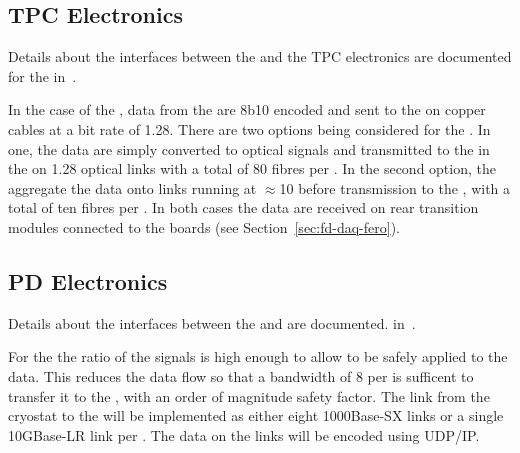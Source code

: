
\subsection{TPC Electronics}
\label{sec:fd-daq-intfc-elec}

Details about the interfaces between the  and the TPC electronics
are documented for the  
in~\cite{docdb-6742}.

In the case of the , data from the  
 are 8b10 encoded and sent to the
 on copper cables at a bit rate of \SI{1.28}{\Gbps}. There
are two options being considered for the . In one, the
data are simply converted to optical signals and transmitted to the
 in the  on \SI{1.28}{\Gbps} optical links with a total of \num{80}
fibres per . In the second option, the  aggregate the
data onto links running at $\approx$\SI{10}{\Gbps} before transmission
to the , with a total of ten fibres per . In both cases the data
are received on rear transition modules connected to the 
 boards (see Section~\ref{sec:fd-daq-fero}).


\subsection{PD Electronics}
\label{sec:fd-daq-intfc-photon}

Details about the interfaces between the  and 
 are documented. in~\cite{docdb-6727}.


For the   the  ratio of the
 signals is high enough to allow  to be safely
applied to the data. This reduces the data flow so that a bandwidth of
\SI{8}{\Gbps} per  is sufficent to transfer it to the ,
with an order of magnitude safety factor. The link from the 
cryostat to the  will be implemented as either eight 1000Base-SX
links or a single 10GBase-LR link per .
The data on the links will be encoded using UDP/IP.
